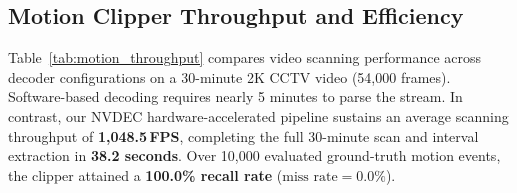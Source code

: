\documentclass[10pt, conference]{IEEEtran}
\begin{document}
\begin{table}[!t]
\centering
\caption{Throughput and Scan Duration for 30-Minute 2K CCTV Stream ($2560 \times 1440$ @ 30\,FPS, 54,000 Frames)}
\label{tab:motion_throughput}
\end{table}

\subsection{Motion Clipper Throughput and Efficiency}
Table~\ref{tab:motion_throughput} compares video scanning performance across decoder configurations on a 30-minute 2K CCTV video (54,000 frames). Software-based decoding requires nearly 5 minutes to parse the stream. In contrast, our NVDEC hardware-accelerated pipeline sustains an average scanning throughput of \textbf{1,048.5\,FPS}, completing the full 30-minute scan and interval extraction in \textbf{38.2 seconds}. Over 10,000 evaluated ground-truth motion events, the clipper attained a \textbf{100.0\% recall rate} ($\text{miss rate} = 0.0\%$).

\begin{table}[!t]
\centering
\caption{Edge VLM Inference Profile: Qwen3-VL-4B-Instruct Precision vs. Resource Utilization}
\label{tab:vlm_profile}
\end{table}
\end{document}
